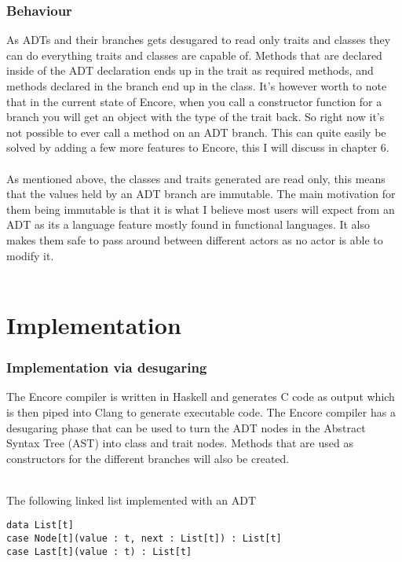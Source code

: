 \documentclass[10pt]{report}
\begin{document}
\subsection{Behaviour}
As ADTs and their branches gets desugared to read only traits and classes they can do everything traits and classes are capable of.
Methods that are declared inside of the ADT declaration ends up in the trait as required methods, and methods declared in the branch end up in the class. It's however worth to note that in the current state of Encore, when you call a constructor function for a branch you will get an object with the type of the trait back. So right now it's not possible to ever call a method on an ADT branch. This can quite easily be solved by adding a few more features to Encore, this I will discuss in chapter 6.
\\\\As mentioned above, the classes and traits generated are read only, this means that the values held by an ADT branch are immutable.  The main motivation for them being immutable is that it is what I believe most users will expect from an ADT as its a language feature mostly found in functional languages. It also makes them safe to pass around between different actors as no actor is able to modify it.\\\\
\chapter{Implementation}

\subsection{Implementation via desugaring}
\par{\noindent The Encore compiler is written in Haskell and generates C code as output which is then piped into Clang to generate executable code. The Encore compiler has a desugaring phase that can be used to turn the ADT nodes in the Abstract Syntax Tree (AST) into class and trait nodes. Methods that are used as constructors for the different branches will also be created.\\\\}
\par{\noindent The following linked list implemented with an ADT}

\begin{lstlisting}[language=encore,caption={Linked list before it has been desugared}]
data List[t]
case Node[t](value : t, next : List[t]) : List[t]
case Last[t](value : t) : List[t]
\end{lstlisting}
\end{document}
